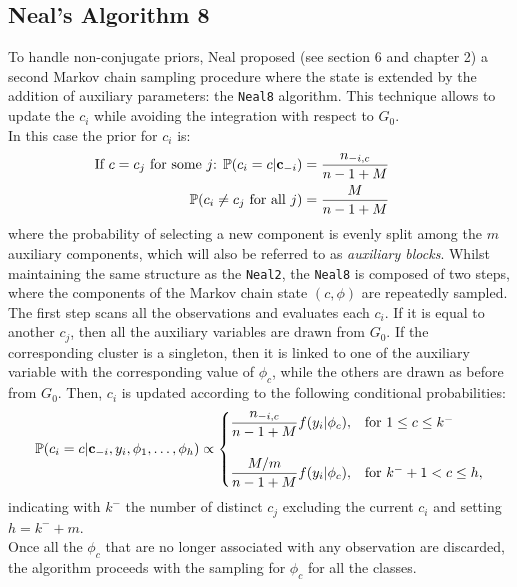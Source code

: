 \subsection{Neal's Algorithm 8} \label{neal8}
To handle non-conjugate priors, Neal proposed (see \cite{neal} section 6 and \cite{book} chapter 2) a second Markov chain sampling procedure where the state is extended by the addition of auxiliary parameters: the \verb|Neal8| algorithm.
This technique allows to update the $c_i$ while avoiding the integration with respect to $G_0$. \\
In this case the prior for $c_i$ is:
\begin{equation}
	\begin{aligned}
		\hspace{-25pt}
		\vspace{-12pt}
		\text{If $c=c_j$ for some $j$: } \PP(c_i=c | \mathbf c_{-i}) &= \frac{n_{-i,c}}{n-1+M}   \\
		\PP(c_{i}\neq c_{j} \text{ for all } j) &=\frac{M }{n-1+M}
	\end{aligned}	
\end{equation}
where the probability of selecting a new component is evenly split among the $m$ auxiliary components, which will also be referred to as \emph{auxiliary blocks}.
Whilst maintaining the same structure as the \verb|Neal2|, the \verb|Neal8| is composed of two steps, where the components of the Markov chain state $(c,\phi)$ are repeatedly sampled.
The first step scans all the observations and evaluates each $c_i$.
If it is equal to another $c_j$, then all the auxiliary variables are drawn from $G_0$.
If the corresponding cluster is a singleton, then it is linked to one of the auxiliary variable with the corresponding value of $\phi_c$, while the others are drawn as before from $G_0$.
Then, $c_i$ is updated according to the following conditional probabilities:
\begin{equation}
	\begin{aligned} \label{neal8prob}
		\mathbb P(c_{i}=c | \mathbf c_{-i}, y_{i}, \phi_{1},\dots,\phi_{h}) \propto
		\begin{cases}
			\dfrac{n_{-i,c}}{n-1+M}f(y_{i}|\phi_{c}), & \mbox{for } 1 \leq c \leq k^{-} \\
			\\
			\dfrac{M/m}{n-1+M}f(y_{i}|\phi_{c}), & \mbox{for } k^{-}+1 < c \leq h,
		\end{cases}
	\end{aligned}
\end{equation}
indicating with $k^{-}$ the number of distinct $c_j$ excluding the current $c_i$ and setting $h=k^{-}+m$. \\
Once all the $\phi_c$ that are no longer associated with any observation are discarded, the algorithm proceeds with the sampling for $\phi_c$ for all the classes.


